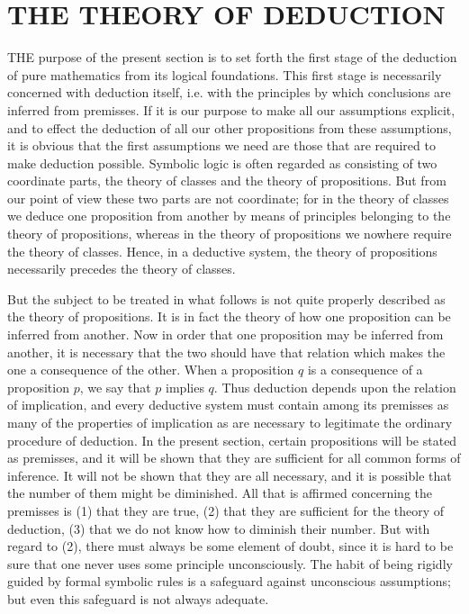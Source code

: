 \documentclass[10pt]{article}
\begin{document}
\section*{THE THEORY OF DEDUCTION}
THE purpose of the present section is to set forth the first stage of the deduction of pure mathematics from its logical foundations. This first stage is necessarily concerned with deduction itself, i.e. with the principles by which conclusions are inferred from premisses. If it is our purpose to make all our assumptions explicit, and to effect the deduction of all our other propositions from these assumptions, it is obvious that the first assumptions we need are those that are required to make deduction possible. Symbolic logic is often regarded as consisting of two coordinate parts, the theory of classes and the theory of propositions. But from our point of view these two parts are not coordinate; for in the theory of classes we deduce one proposition from another by means of principles belonging to the theory of propositions, whereas in the theory of propositions we nowhere require the theory of classes. Hence, in a deductive system, the theory of propositions necessarily precedes the theory of classes.

But the subject to be treated in what follows is not quite properly described as the theory of propositions. It is in fact the theory of how one proposition can be inferred from another. Now in order that one proposition may be inferred from another, it is necessary that the two should have that relation which makes the one a consequence of the other. When a proposition $q$ is a consequence of a proposition $p$, we say that $p$ implies $q$. Thus deduction depends upon the relation of implication, and every deductive system must contain among its premisses as many of the properties of implication as are necessary to legitimate the ordinary procedure of deduction. In the present section, certain propositions will be stated as premisses, and it will be shown that they are sufficient for all common forms of inference. It will not be shown that they are all necessary, and it is possible that the number of them might be diminished. All that is affirmed concerning the premisses is (1) that they are true, (2) that they are sufficient for the theory of deduction, (3) that we do not know how to diminish their number. But with regard to (2), there must always be some element of doubt, since it is hard to be sure that one never uses some principle unconsciously. The habit of being rigidly guided by formal symbolic rules is a safeguard against unconscious assumptions; but even this safeguard is not always adequate.
\end{document}
